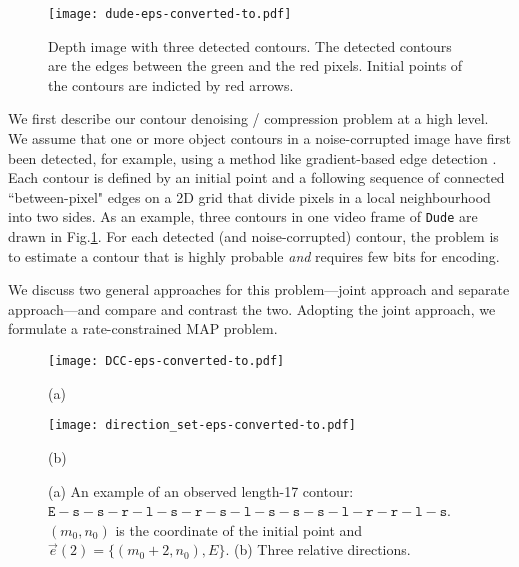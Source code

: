 \begin{figure}[t]

\begin{minipage}[b]{1\linewidth}
  \centering
  \centerline{\texttt{[image: dude-eps-converted-to.pdf]}}
\end{minipage}

\vspace{-0.3cm}
\caption{Depth image with three detected contours.
The detected contours are the edges between the green and the red pixels. 
Initial points of the contours are indicted by red arrows.}
\label{fig:contour_definition}
\end{figure}

We first describe our contour denoising / compression problem at a high level.
We assume that one or more object contours in a noise-corrupted image have first been detected, for example, using a method like gradient-based edge detection \cite{daribo14}.
Each contour is defined by an initial point and a following sequence of connected ``between-pixel" edges on a 2D grid that divide pixels in a local neighbourhood into two sides.
As an example, three contours in one video frame of \texttt{Dude} are drawn in Fig.\;\ref{fig:contour_definition}.
For each detected (and noise-corrupted) contour, the problem is to estimate a contour that is highly probable \textit{and} requires few bits for encoding.

We discuss two general approaches for this problem---joint approach and separate approach---and compare and contrast the two.
Adopting the joint approach, we formulate a rate-constrained MAP problem. 



\begin{figure}[t]

\begin{minipage}[b]{.62\linewidth}
  \centering
  \centerline{\texttt{[image: DCC-eps-converted-to.pdf]}}
  \centerline{(a)}\medskip
\end{minipage}
\hfill
\begin{minipage}[b]{0.36\linewidth}
  \centering
  \centerline{\texttt{[image: direction\_set-eps-converted-to.pdf]}}
  \centerline{(b)}\medskip
\end{minipage}

\vspace{-0.2cm}
\caption{{(a) An example of an observed length-17 contour: $\!\texttt{E}\!-\!\texttt{s}\!-\!\texttt{s}\!-\!\texttt{r}-\!\texttt{l}\!-\!\texttt{s}\!-\!\texttt{r}-\!\texttt{s}\!-\!\texttt{l}\!-\!\texttt{s}\!-\!\texttt{s}\!-\!\texttt{s}\!-\!\texttt{l}\!-\!\texttt{r}\!-\!\texttt{r}\!-\!\texttt{l}\!-\!\texttt{s}$. $(m_0, n_0)$ is the coordinate of the initial point and $\vec{e}(2)=\{(m_0+2,n_0),E\}$. (b) Three relative directions.}}
\label{fig:DCC}
\end{figure}


